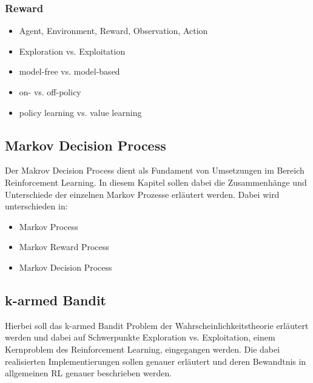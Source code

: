\documentclass[11pt]{scrartcl}
\begin{document}
\subsubsection{Reward}

\begin{itemize}
\itemsep0pt
\item Agent, Environment, Reward, Observation, Action
\item Exploration vs. Exploitation
\item model-free vs. model-based
\item on- vs. off-policy
\item policy learning vs. value learning
\end{itemize}
\subsection{Markov Decision Process}
Der Makrov Decision Process dient als Fundament von Umsetzungen im Bereich Reinforcement Learning. In diesem Kapitel sollen dabei die Zusammenhänge und Unterschiede der einzelnen Markov Prozesse erläutert werden. Dabei wird unterschieden in:
\begin{itemize}
\itemsep0pt
\item Markov Process
\item Markov Reward Process
\item Markov Decision Process 
\end{itemize}

\newpage
\subsection{k-armed Bandit}
Hierbei soll das k-armed Bandit Problem der Wahrscheinlichkeitstheorie erläutert werden
und dabei auf  Schwerpunkte Exploration vs. Exploitation, einem Kernproblem des
Reinforcement Learning, eingegangen werden. Die dabei realisierten Implementierungen
sollen genauer erläutert und deren Bewandtnis in allgemeinen RL genauer beschrieben
werden.
\end{document}
